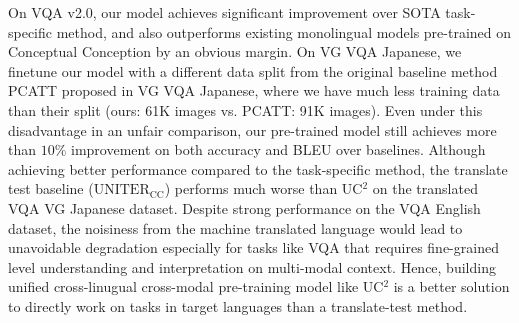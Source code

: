 \documentclass[final]{cvpr}
\newcommand{\jj}[1]{\textcolor{red}{\small{\bf [JJ: #1 ]}}}
\newcommand{\mingyang}[1]{\textcolor{brown}{\small{\bf [Mingyang: #1 ]}}}
\begin{document}
On VQA v2.0, our model achieves significant improvement over SOTA task-specific method,
and also outperforms existing monolingual models pre-trained on Conceptual Conception \cite{vilbert, su2020vlbert, UNITER} by an obvious margin. 
On VG VQA Japanese, we finetune our model with a different data split from the original baseline method PCATT proposed in VG VQA Japanese, where we have much less training data than their split (ours: 61K images vs. PCATT: 91K images). Even under this disadvantage in an unfair comparison, our pre-trained model still achieves more than $10\%$ improvement on both accuracy and BLEU over baselines.
Although achieving better performance compared to the task-specific method, the translate test baseline ($\text{UNITER}_{\text{CC}}$) performs much worse than UC$^2$ on the translated VQA VG Japanese dataset. Despite strong performance on the VQA English dataset, the noisiness from the machine translated language would lead to unavoidable degradation especially for tasks like VQA that requires fine-grained level understanding and interpretation on multi-modal context. Hence, building unified cross-linugual cross-modal pre-training model like UC$^2$ is a better solution to directly work on tasks in target languages than a translate-test method.  

\end{document}
